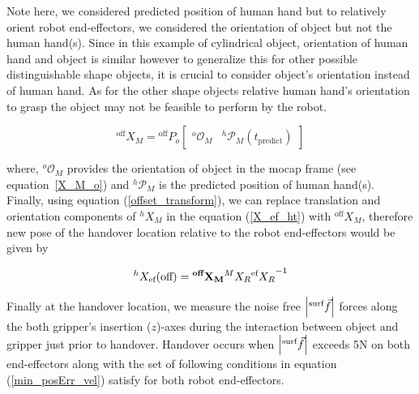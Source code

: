 Note here, we considered predicted position of human hand but to relatively orient robot end-effectors, we considered the orientation of object but not the human hand(s). Since in this example of cylindrical object, orientation of human hand and object is similar however to generalize this for other possible distinguishable shape objects, it is crucial to consider object's orientation instead of human hand. As for the other shape objects relative human hand's orientation to grasp the object may not be feasible to perform by the robot. 


\begin{equation}\label{offset_transform}
{}^\text{off}{X}_{M} = 
{}^\text{off}{P}_{o}
 \left[\begin{array}{cc}
{}^{o}\mathcal{O}_M & {}^{h}\mathcal{P}_M(t_\text{predict})
\end{array}\right]
\end{equation}


where, ${}^{o}\mathcal{O}_M$ provides the orientation of object in the mocap frame (see equation~\ref{X_M_o}) and ${}^{h}\mathcal{P}_M$ is the predicted position of human hand(s). Finally, using equation (\ref{offset_transform}), we can replace translation and orientation components of ${}^{h}{X}_M$ in the equation (\ref{X_ef_ht}) with ${}^\text{off}{X}_{M}$, therefore new pose of the handover location relative to the robot end-effectors would be given by

\begin{equation}
	{}^{h}{X}_{\text{ef}}(\text{off}) =  {\bf{}^{\text{\bf off}}{X}_M}  {}^{M}{X}_R {{}^{\text{ef}}{X}_R}^{-1}
\end{equation}

Finally at the handover location, we measure the noise free $\abs{{}^\text{surf}\vec{f}}$ forces along the both gripper's insertion ($z$)-axes during the interaction between object and gripper just prior to handover. Handover occurs when $\abs{{}^\text{surf}\vec{f}}$ exceeds 5N on both end-effectors along with the set of following conditions in equation (\ref{min_posErr_vel}) satisfy for both robot end-effectors.


